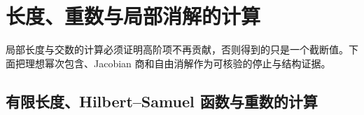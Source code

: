 
\section{长度、重数与局部消解的计算}
\label{b3:sec:F04}

局部长度与交数的计算必须证明高阶项不再贡献，否则得到的只是一个截断值。下面把理想幂次包含、Jacobian 商和自由消解作为可核验的停止与结构证据。


\subsection{有限长度、Hilbert–Samuel 函数与重数的计算}
\label{b3:subsec:F04:01}

